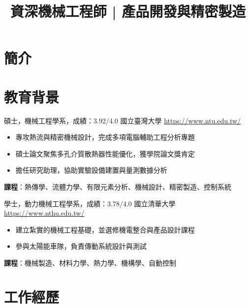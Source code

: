 \documentclass[a4paper, serif, 10pt]{moderncv}
\title{資深機械工程師 | 產品開發與精密製造}
\begin{document}
\maketitle

\section{簡介}

\section{教育背景}

        {碩士，機械工程學系，成績：3.92/4.0}
        {國立臺灣大學}
        {\url{https://www.ntu.edu.tw/}}
        {}
        {\begin{itemize}
\item 專攻熱流與精密機械設計，完成多項電腦輔助工程分析專題
\item 碩士論文聚焦多孔介質散熱器性能優化，獲學院論文獎肯定
\item 擔任研究助理，協助實驗設備建置與量測數據分析
\end{itemize}
\textbf{課程}：熱傳學、流體力學、有限元素分析、機械設計、精密製造、控制系統}

        {學士，動力機械工程學系，成績：3.78/4.0}
        {國立清華大學}
        {\url{https://www.nthu.edu.tw/}}
        {}
        {\begin{itemize}
\item 建立紮實的機械工程基礎，並選修機電整合與產品設計課程
\item 參與太陽能車隊，負責傳動系統設計與測試
\end{itemize}
\textbf{課程}：機械製造、材料力學、熱力學、機構學、自動控制}
\section{工作經歷}
\end{document}
